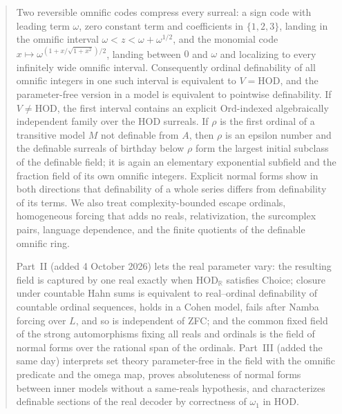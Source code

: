 \documentclass[11pt,a4paper]{article}
\numberwithin{equation}{section}
\theoremstyle{definition}
\theoremstyle{remark}
\newcommand{\Ord}{\mathrm{Ord}}
\newcommand{\HOD}{\mathrm{HOD}}
\newcommand{\R}{\mathbb R}
\begin{document}
\begin{titlepage}
\begin{minipage}{\textwidth}
\begin{abstract}
Two reversible omnific codes compress every surreal: a sign code with
leading term $\omega$, zero constant term and coefficients in
$\{1,2,3\}$, landing in the omnific interval $\omega<z<\omega+\omega^{1/2}$,
and the monomial code $x\mapsto\omega^{(1+x/\sqrt{1+x^2})/2}$, landing
between $0$ and $\omega$ and localizing to every infinitely wide omnific
interval. Consequently ordinal definability of all omnific integers in one
such interval is equivalent to $V=\HOD$, and the parameter-free version in
a model is equivalent to pointwise definability. If $V\ne\HOD$, the first
interval contains an explicit $\Ord$-indexed algebraically independent
family over the $\HOD$ surreals. If $\rho$ is the first ordinal of a
transitive model $M$ not definable from $A$, then $\rho$ is an epsilon
number and the definable surreals of birthday below $\rho$ form the largest
initial subclass of the definable field; it is again an elementary
exponential subfield and the fraction field of its own omnific integers.
Explicit normal forms show in both directions that definability of a whole
series differs from definability of its terms. We also treat
complexity-bounded escape ordinals, homogeneous forcing that adds no reals,
relativization, the surcomplex pairs, language dependence, and the finite
quotients of the definable omnific ring.

Part~II (added 4 October 2026) lets the real parameter vary: the
resulting field is captured by one real exactly when $\HOD_{\R}$
satisfies Choice; closure under countable Hahn sums is equivalent to
real--ordinal definability of countable ordinal sequences, holds in a
Cohen model, fails after Namba forcing over $L$, and so is independent of
ZFC; and the common fixed field of the strong automorphisms fixing all
reals and ordinals is the field of normal forms over the rational span of
the ordinals. Part~III (added the same day) interprets set theory
parameter-free in the field with the omnific predicate and the omega map,
proves absoluteness of normal forms between inner models without a
same-reals hypothesis, and characterizes definable sections of the real
decoder by correctness of $\omega_1$ in $\HOD$.


\end{abstract}
\end{minipage}
\end{titlepage}
\end{document}

